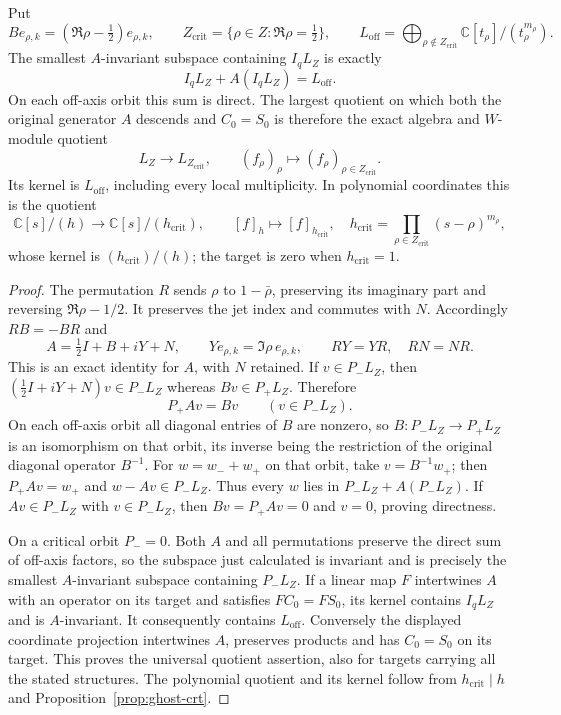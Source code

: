 \begin{theorem}
\label{thm:ghost-arithmetic-saturation}
Put
\[
 B e_{\rho,k}=(\Re\rho-\tfrac12)e_{\rho,k},\qquad
 Z_{\mathrm{crit}}=\{\rho\in Z:\Re\rho=\tfrac12\},\qquad
 L_{\mathrm{off}}=\bigoplus_{\rho\notin Z_{\mathrm{crit}}}
             \mathbb C[t_\rho]/(t_\rho^{m_\rho}).
\]
The smallest $A$-invariant subspace containing $I_qL_Z$ is exactly
\[
 I_qL_Z+A(I_qL_Z)=L_{\mathrm{off}}.
\]
On each off-axis orbit this sum is direct.  The largest quotient on
which both the original generator $A$ descends and $C_0=S_0$ is therefore
the exact algebra and $W$-module quotient
\[
 L_Z\longrightarrow L_{Z_{\mathrm{crit}}},
 \qquad (f_\rho)_\rho\longmapsto(f_\rho)_{\rho\in Z_{\mathrm{crit}}}.
\]
Its kernel is $L_{\mathrm{off}}$, including every local multiplicity.
In polynomial coordinates this is the quotient
\[
 \mathbb C[s]/(h)\longrightarrow
 \mathbb C[s]/(h_{\mathrm{crit}}),\qquad [f]_h\longmapsto[f]_{h_{\mathrm{crit}}},
 \quad h_{\mathrm{crit}}=\prod_{\rho\in Z_{\mathrm{crit}}}
                         (s-\rho)^{m_\rho},
\]
whose kernel is $(h_{\mathrm{crit}})/(h)$; the target is zero when
$h_{\mathrm{crit}}=1$.
\end{theorem}
\begin{proof}
The permutation $R$ sends $\rho$ to $1-\bar\rho$, preserving its imaginary
part and reversing $\Re\rho-1/2$.  It preserves the jet index and commutes
with $N$.  Accordingly $RB=-BR$ and
\[
 A=\tfrac12 I+B+iY+N,\qquad
 Ye_{\rho,k}=\Im\rho\,e_{\rho,k},\qquad
 RY=YR,\quad RN=NR.
\]
This is an exact identity for $A$, with $N$ retained.  If $v\in P_-L_Z$,
then $(\tfrac12I+iY+N)v\in P_-L_Z$ whereas $Bv\in P_+L_Z$.
Therefore
\[
 P_+Av=Bv\qquad(v\in P_-L_Z).
\]
On each off-axis orbit all diagonal entries of $B$ are nonzero, so
$B:P_-L_Z\to P_+L_Z$ is an isomorphism on that orbit, its inverse being
the restriction of the original diagonal operator $B^{-1}$.
For $w=w_-+w_+$ on that orbit, take $v=B^{-1}w_+$; then
$P_+Av=w_+$ and $w-Av\in P_-L_Z$.  Thus every $w$ lies in
$P_-L_Z+A(P_-L_Z)$.  If $Av\in P_-L_Z$ with $v\in P_-L_Z$, then
$Bv=P_+Av=0$ and $v=0$, proving directness.

On a critical orbit $P_-=0$.  Both $A$ and all permutations preserve
the direct sum of off-axis factors, so the subspace just calculated
is invariant and is precisely the smallest $A$-invariant subspace
containing $P_-L_Z$.  If a linear map $F$ intertwines $A$ with an operator
on its target and satisfies $FC_0=FS_0$, its kernel contains
$I_qL_Z$ and is $A$-invariant.  It consequently contains $L_{\mathrm{off}}$.
Conversely the displayed coordinate projection intertwines $A$,
preserves products and has $C_0=S_0$ on its target.  This proves the
universal quotient assertion, also for targets carrying all the stated
structures.  The polynomial quotient and its kernel follow from
$h_{\mathrm{crit}}\mid h$ and Proposition~\ref{prop:ghost-crt}.
\end{proof}

